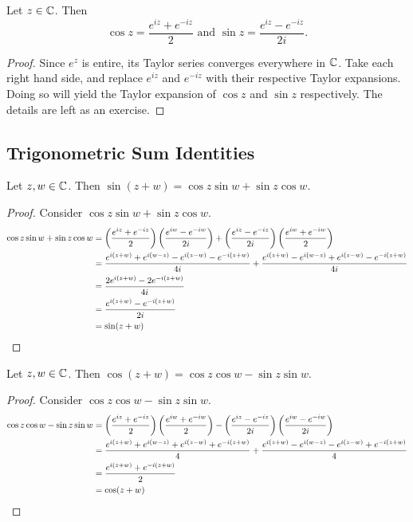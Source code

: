 \documentclass[notitlepage]{problem-solving}
\begin{document}
\begin{proposition}
	Let $z\in\mathbb{C}$.
	Then
	\[
		\cos z = \frac{ e^{iz} + e^{-iz} }{2} \text{ and } \sin z = \frac{ e^{iz} - e^{-iz} }{2i}.
	\]
\end{proposition}
\begin{proof}
	Since $e^z$ is entire, its Taylor series converges everywhere in $\mathbb{C}$.
	Take each right hand side, and replace $e^{iz}$ and $e^{-iz}$ with their respective Taylor expansions.
	Doing so will yield the Taylor expansion of $\cos z$ and $\sin z$ respectively.
	The details are left as an exercise.
\end{proof}

\subsection{Trigonometric Sum Identities}
\begin{thm}
	Let $z,w\in\mathbb{C}$.
	Then $\sin(z+w)=\cos z\sin w+\sin z\cos w$.
\end{thm}
\begin{proof}
	Consider $\cos z\sin w+\sin z\cos w$.
	\begin{align*}
		\cos z\sin w+\sin z\cos w &=
		\left( \frac{e^{iz}+e^{-iz}}{2} \right)\left( \frac{e^{iw}-e^{-iw}}{2i} \right)+\left( \frac{e^{iz}-e^{-iz}}{2i} \right)\left( \frac{e^{iw}+e^{-iw}}{2} \right)\\
		&= \frac{e^{i(z+w)} +e^{i(w-z)} - e^{i(z-w)} - e^{-i(z+w)}}{4i} + \frac{e^{i(z+w)} -e^{i(w-z)} + e^{i(z-w)} - e^{-i(z+w)}}{4i}\\
		&= \frac{2e^{i(z+w)}-2e^{-i(z+w)}}{4i}\\
		&= \frac{e^{i(z+w)}-e^{-i(z+w)}}{2i}\\
		&= \sin(z+w)
	\end{align*}
\end{proof}

\begin{thm}
	Let $z,w\in\mathbb{C}$.
	Then $\cos(z+w)=\cos z\cos w - \sin z\sin w$.
\end{thm}
\begin{proof}
	Consider $\cos z\cos w - \sin z\sin w$.
	\begin{align*}
		\cos z\cos w - \sin z\sin w &=
		\left( \frac{e^{iz}+e^{-iz}}{2} \right)\left( \frac{e^{iw}+e^{-iw}}{2} \right) - \left( \frac{e^{iz}-e^{-iz}}{2i} \right)\left( \frac{e^{iw}-e^{-iw}}{2i} \right)\\
		&= \frac{e^{i(z+w)} + e^{i(w-z)} + e^{i(z-w)} + e^{-i(z+w)}}{4} + \frac{e^{i(z+w)} -e^{i(w-z)} - e^{i(z-w)} + e^{-i(z+w)}}{4}\\
		&= \frac{e^{i(z+w)}+e^{-i(z+w)}}{2}\\
		&= \cos(z+w)
	\end{align*}
\end{proof}

\printbibliography
\end{document}
